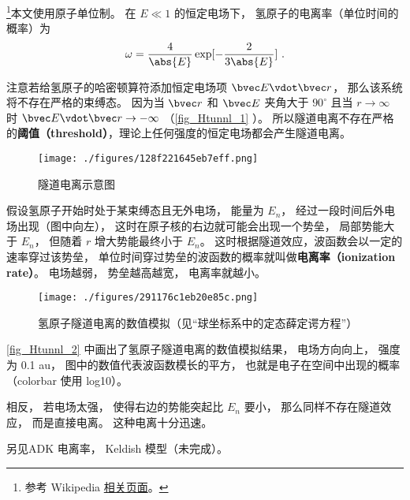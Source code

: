 

\footnote{参考 Wikipedia \href{https://en.wikipedia.org/wiki/Tunnel_ionization}{相关页面}。}本文使用原子单位制。 在 $E \ll 1$ 的恒定电场下， 氢原子的电离率（单位时间的概率）为
\begin{equation}
\omega = \frac{4}{\abs{E}} \exp[-\frac{2}{3\abs{E}}]~.
\end{equation}

注意若给氢原子的哈密顿算符添加恒定电场项 $\bvec E \vdot \bvec r$， 那么该系统将不存在严格的束缚态。 因为当 $\bvec r$ 和 $\bvec E$ 夹角大于 $90^\circ$ 且当 $r\to\infty$ 时 $\bvec E \vdot \bvec r \to -\infty$ （\autoref{fig_Htunnl_1} ）。 所以隧道电离不存在严格的\textbf{阈值（threshold）}，理论上任何强度的恒定电场都会产生隧道电离。

\begin{figure}[ht]
\centering
\texttt{[image: ./figures/128f221645eb7eff.png]}
\caption{隧道电离示意图} \label{fig_Htunnl_1}
\end{figure}

假设氢原子开始时处于某束缚态且无外电场， 能量为 $E_n$， 经过一段时间后外电场出现（图中向左）， 这时在原子核的右边就可能会出现一个势垒， 局部势能大于 $E_n$， 但随着 $r$ 增大势能最终小于 $E_n$。 这时根据隧道效应，波函数会以一定的速率穿过该势垒， 单位时间穿过势垒的波函数的概率就叫做\textbf{电离率（ionization rate）}。 电场越弱， 势垒越高越宽， 电离率就越小。

\begin{figure}[ht]
\centering
\texttt{[image: ./figures/291176c1eb20e85c.png]}
\caption{氢原子隧道电离的数值模拟（见“球坐标系中的定态薛定谔方程”）} \label{fig_Htunnl_2}
\end{figure}
\autoref{fig_Htunnl_2} 中画出了氢原子隧道电离的数值模拟结果， 电场方向向上， 强度为 0.1 au， 图中的数值代表波函数模长的平方， 也就是电子在空间中出现的概率（colorbar 使用 log10）。

相反， 若电场太强， 使得右边的势能突起比 $E_n$ 要小， 那么同样不存在隧道效应， 而是直接电离。 这种电离十分迅速。

另见ADK 电离率， Keldish 模型（未完成）。
